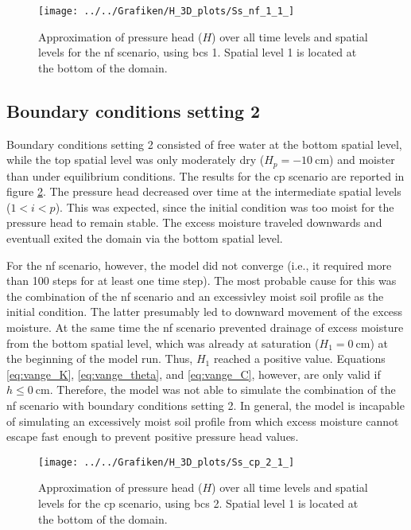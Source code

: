 \begin{figure}[H]
  \centering
  \texttt{[image: ../../Grafiken/H\_3D\_plots/Ss\_nf\_1\_1\_]}
  \caption{Approximation of pressure head ($H$) over all time levels and spatial levels for the nf scenario, using bcs 1.  Spatial level 1 is located at the bottom of the domain.}
  \label{fig:nf1}
\end{figure}

\subsection{Boundary conditions setting 2}

Boundary conditions setting 2 consisted of free water at the bottom spatial level, while the top spatial level was only moderately dry ($H_p = \SI{-10}{\centi\meter}$) and moister than under equilibrium conditions.  The results for the cp scenario are reported in figure \ref{fig:cp2}.  The pressure head decreased over time at the intermediate spatial levels ($1 < i < p$).  This was expected, since the initial condition was too moist for the pressure head to remain stable.  The excess moisture traveled downwards and eventuall exited the domain via the bottom spatial level.

For the nf scenario, however, the model did not converge (i.e., it required more than \num{100} steps for at least one time step).  The most probable cause for this was the combination of the nf scenario and an excessivley moist soil profile as the initial condition.  The latter presumably led to downward movement of the excess moisture.  At the same time the nf scenario prevented drainage of excess moisture from the bottom spatial level, which was already at saturation ($H_1 = \SI{0}{\centi\meter}$) at the beginning of the model run.  Thus, $H_1$ reached a positive value.  Equations \eqref{eq:vange_K}, \eqref{eq:vange_theta}, and \eqref{eq:vange_C}, however, are only valid if $h \leq \SI{0}{\centi\meter}$.  Therefore, the model was not able to simulate the combination of the nf scenario with boundary conditions setting 2.  In general, the model is incapable of simulating an excessively moist soil profile from which excess moisture cannot escape fast enough to prevent positive pressure head values.

\begin{figure}[H]
  \centering
  \texttt{[image: ../../Grafiken/H\_3D\_plots/Ss\_cp\_2\_1\_]}
  \caption{Approximation of pressure head ($H$) over all time levels and spatial levels for the cp scenario, using bcs 2.  Spatial level 1 is located at the bottom of the domain.}
  \label{fig:cp2}
\end{figure}

